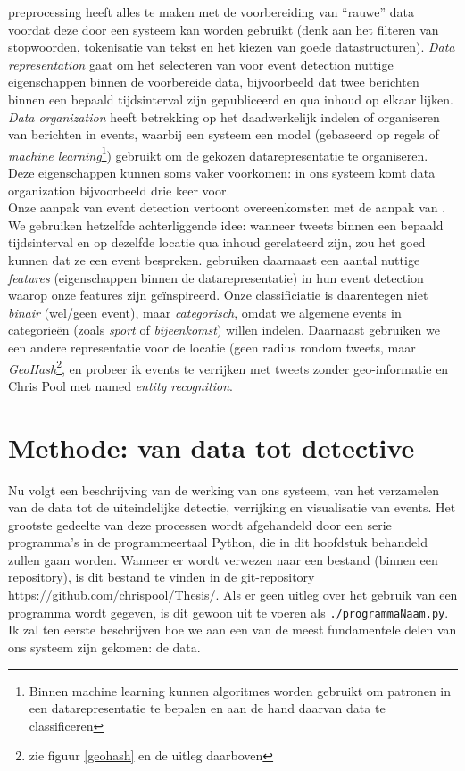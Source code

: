 \documentclass[a4paper,10pt,titlepage]{article}
\def\vl{\\[9pt]}                              %
\def\s{\section}                              %
\def\ttt{\texttt}                             %
\def\it{\textit}                              %
\begin{document}
{{{preprocessing} heeft alles te maken met de voorbereiding van ``rauwe'' data voordat 
deze door een systeem kan worden gebruikt (denk aan het filteren van 
stopwoorden, tokenisatie van tekst en het kiezen van goede datastructuren). 
\it{Data representation} gaat om het selecteren van voor event detection nuttige 
eigenschappen binnen de voorbereide data, bijvoorbeeld dat twee berichten binnen 
een bepaald tijdsinterval zijn gepubliceerd en qua inhoud op elkaar lijken. \it{Data 
organization} heeft betrekking op het daadwerkelijk indelen of organiseren van 
berichten in events, waarbij een systeem een model (gebaseerd op regels of 
\it{machine learning}\footnote{Binnen machine learning kunnen algoritmes worden 
gebruikt om patronen in een datarepresentatie te bepalen en aan de hand daarvan
data te classificeren}) gebruikt om de gekozen datarepresentatie te organiseren. 
Deze eigenschappen kunnen soms vaker voorkomen: in ons systeem komt data organization
bijvoorbeeld drie keer voor.
\vl
Onze aanpak van event detection vertoont overeenkomsten met de aanpak van 
\citeauthor{walther2013geo}. We gebruiken hetzelfde achterliggende idee: wanneer tweets 
binnen een bepaald tijdsinterval en op dezelfde locatie qua inhoud gerelateerd 
zijn, zou het goed kunnen dat ze een event bespreken. \citeauthor{walther2013geo} gebruiken 
daarnaast een aantal nuttige \it{features} (eigenschappen binnen de datarepresentatie) in 
hun event detection waarop onze features zijn geïnspireerd. Onze classificiatie 
is daarentegen niet \it{binair} (wel/geen event), maar \it{categorisch}, omdat we algemene 
events in categorieën (zoals \it{sport} of \it{bijeenkomst}) willen indelen. Daarnaast gebruiken we een andere 
representatie voor de locatie (geen radius rondom tweets, maar \it{GeoHash}\footnote{zie 
figuur \ref{geohash} en de uitleg daarboven}, en probeer ik events te verrijken met tweets zonder geo-informatie en 
Chris Pool met named \it{entity recognition}.

\s{Methode: van data tot detective}\label{methode}

Nu volgt een beschrijving van de werking van ons systeem, van het verzamelen 
van de data tot de uiteindelijke detectie, verrijking en visualisatie van 
events. Het grootste gedeelte van deze processen wordt afgehandeld door een 
serie programma's in de programmeertaal Python, die in dit hoofdstuk behandeld 
zullen gaan worden. Wanneer er wordt verwezen naar een bestand (binnen een 
repository), is dit bestand te vinden in de git-repository 
\url{https://github.com/chrispool/Thesis/}. Als er geen uitleg over het gebruik 
van een programma wordt gegeven, is dit gewoon uit te voeren als 
\ttt{./programmaNaam.py}. Ik zal ten eerste beschrijven hoe we aan een van de 
meest fundamentele delen van ons systeem zijn gekomen: de data.

}}
\end{document}

